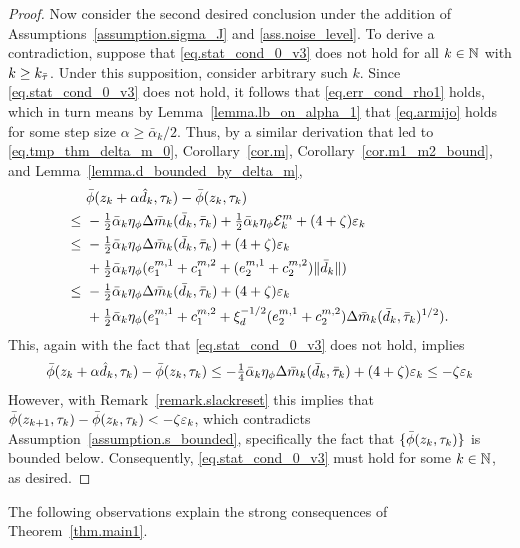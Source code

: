 \begin{proof}
  Now consider the second desired conclusion under the addition of Assumptions~\ref{assumption.sigma_J} and \ref{ass.noise_level}.  To derive a contradiction, suppose that \eqref{eq.stat_cond_0_v3} does not hold for all $k \in \mathbb{N}$ with $k \geq k_{{\bar \tau}}$.  Under this supposition, consider arbitrary such $k$.  Since \eqref{eq.stat_cond_0_v3} does not hold, it follows that \eqref{eq.err_cond_rho1} holds, which in turn means by Lemma~\ref{lemma.lb_on_alpha_1} that \eqref{eq.armijo} holds for some step size $\alpha \geq \bar\alpha_k/2$.  Thus, by a similar derivation that led to \eqref{eq.tmp_thm_delta_m_0}, Corollary~\ref{cor.m}, Corollary~\ref{cor.m1_m2_bound}, and Lemma~\ref{lemma.d_bounded_by_delta_m},
  \begin{align*}
    &\ {\bar \phi}(z_k + \alpha {\hat d}_k, \tau_k) -  {\bar \phi}(z_k, \tau_k) \\
    \leq&\ -\tfrac{1}{2} {\bar \alpha}_k \eta_\phi \Delta {\bar m}_k({\bar d}_k, {\bar \tau}_k) + \tfrac{1}{2} {\bar \alpha}_k \eta_\phi \mathcal{E}_k^m + (4 + \zeta) \varepsilon_k \\
    \leq&\ -\tfrac{1}{2} {\bar \alpha}_k \eta_\phi \Delta {\bar m}_k({\bar d}_k, {\bar \tau}_k) + (4 + \zeta) \varepsilon_k \\
    &\ + \tfrac{1}{2} {\bar \alpha}_k \eta_\phi (e_1^{m, 1} + c_1^{m, 2} + (e_2^{m, 1} + c_2^{m, 2}) \|{\bar d}_k\| ) \\
    \leq&\ -\tfrac{1}{2} {\bar \alpha}_k \eta_\phi \Delta {\bar m}_k({\bar d}_k, {\bar \tau}_k) + (4 + \zeta) \varepsilon_k \\
    &\ + \tfrac{1}{2} {\bar \alpha}_k \eta_\phi (e_1^{m, 1} + c_1^{m, 2} + \xi_d^{-1/2} (e_2^{m, 1} + c_2^{m, 2}) \Delta  {\bar m}_k({\bar d}_k, {\bar \tau}_k)^{1/2} ).
  \end{align*}
  This, again with the fact that \eqref{eq.stat_cond_0_v3} does not hold, implies
  \begin{equation*}
    {\bar \phi}(z_k + \alpha {\hat d}_k, \tau_k) -  {\bar \phi}(z_k, \tau_k) \leq - \tfrac14 {\bar \alpha}_k \eta_\phi \Delta  {\bar m}_k({\bar d}_k, {\bar \tau}_k) + (4 + \zeta) \varepsilon_k \leq -\zeta \varepsilon_k
  \end{equation*}
  However, with Remark~\ref{remark.slackreset} this implies that ${\bar \phi}(z_{k+1}, \tau_k) - {\bar \phi}(z_k, \tau_k) < - \zeta \varepsilon_k$, which contradicts Assumption~\ref{assumption.s_bounded}, specifically the fact that $\{{\bar \phi}(z_k,\tau_k)\}$ is bounded below.  Consequently, \eqref{eq.stat_cond_0_v3} must hold for some $k \in \mathbb{N}$, as desired.
\end{proof}

The following observations explain the strong consequences of Theorem~\ref{thm.main1}.


